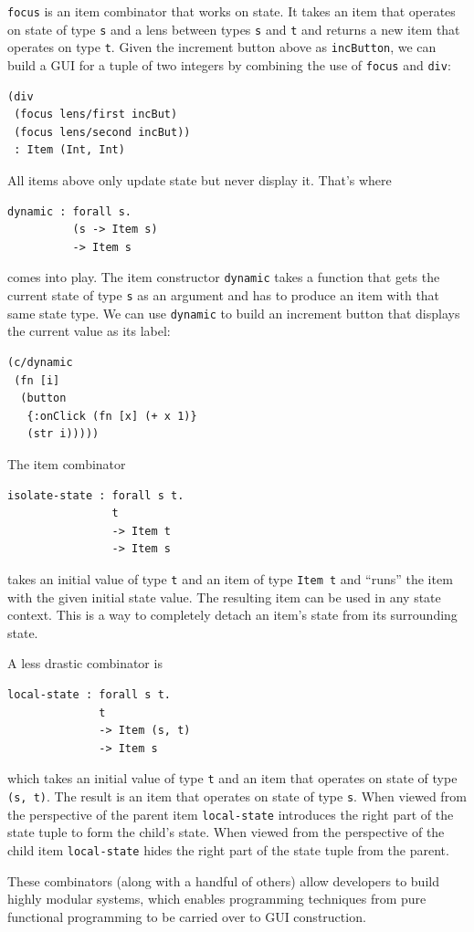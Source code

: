 \documentclass[sigplan,review,screen]{acmart}
\begin{document}
\texttt{focus} is an item combinator that works on state. It takes an
item that operates on state of type \texttt{s} and a lens between
types \texttt{s} and \texttt{t} and returns a new item that operates
on type \texttt{t}.  Given the increment button above as
\texttt{incButton}, we can build a GUI for a tuple of two integers by
combining the use of \texttt{focus} and \texttt{div}:
%
\begin{verbatim}
(div
 (focus lens/first incBut)
 (focus lens/second incBut))
 : Item (Int, Int)
\end{verbatim}
%
All items above only update
state but never display it. That's where
%
\begin{verbatim}
dynamic : forall s.
          (s -> Item s)
          -> Item s
\end{verbatim}
%
comes into play.  The item constructor \texttt{dynamic} takes a
function that gets the current state of type \texttt{s} as an argument
and has to produce an item with that same state type. We can use
\texttt{dynamic} to build an increment button that displays the
current value as its label:
%
\begin{verbatim}
(c/dynamic
 (fn [i]
  (button
   {:onClick (fn [x] (+ x 1)}
   (str i)))))
\end{verbatim}
%
The item combinator
%
\begin{verbatim}
isolate-state : forall s t.
                t
                -> Item t
                -> Item s
\end{verbatim}
%
takes an initial value of type \texttt{t} and an item of
type \texttt{Item t} and ``runs'' the item with the given initial
state value. The resulting item can be used in any state context. This
is a way to completely detach an item's state from its surrounding
state.

A less drastic combinator is
%
\begin{verbatim}
local-state : forall s t.
              t
              -> Item (s, t)
              -> Item s
\end{verbatim}
%
which takes an initial value of type \texttt{t} and an item that
operates on state of type \texttt{(s, t)}. The result is an item that
operates on state of type \texttt{s}. When viewed from the perspective
of the parent item \texttt{local-state} introduces the right part of
the state tuple to form the child's state. When viewed from the
perspective of the child item \texttt{local-state} hides the right
part of the state tuple from the parent.

These combinators (along with a handful of others) allow developers to
build highly modular systems, which enables programming techniques
from pure functional programming to be carried over to GUI
construction.
\end{document}

